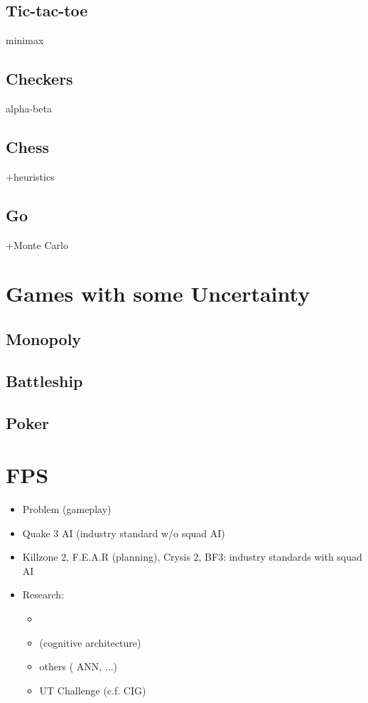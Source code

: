 \subsection{Tic-tac-toe}
minimax
\subsection{Checkers}
alpha-beta
\subsection{Chess}
+heuristics
\subsection{Go}
+Monte Carlo

\section{Games with some Uncertainty}
\subsection{Monopoly}
\subsection{Battleship}
\subsection{Poker}

\citep{gunn}

\section{FPS}
\begin{itemize}
\item Problem (gameplay)
\item Quake 3 AI (industry standard w/o squad AI) \citep{waveren-02-artificial}
\item Killzone 2, F.E.A.R \citep{orkinGDC_FEAR} (planning), Crysis 2, BF3: industry standards with squad AI
\item Research:
\begin{itemize}
\item \citep{lehy04}
\item \citep{Laird01} (cognitive architecture)
\item others (\citep{Hladky_anevaluation} ANN, ...)
\item UT Challenge (c.f. CIG)
\end{itemize}
\end{itemize}

